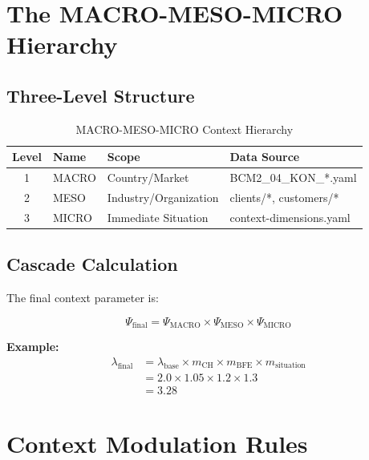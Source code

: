 \section{The MACRO-MESO-MICRO Hierarchy}
\label{sec:when-hierarchy}

\subsection{Three-Level Structure}

\begin{table}[htbp]
\centering
\caption{MACRO-MESO-MICRO Context Hierarchy}
\label{tab:when-hierarchy}
\renewcommand{\arraystretch}{1.3}
\begin{tabular}{@{}clll@{}}
\toprule
\textbf{Level} & \textbf{Name} & \textbf{Scope} & \textbf{Data Source} \\
\midrule
1 & MACRO & Country/Market & BCM2\_04\_KON\_*.yaml \\
2 & MESO & Industry/Organization & clients/*, customers/* \\
3 & MICRO & Immediate Situation & context-dimensions.yaml \\
\bottomrule
\end{tabular}
\end{table}

\subsection{Cascade Calculation}

The final context parameter is:

\begin{equation}
\Psi_{\text{final}} = \Psi_{\text{MACRO}} \times \Psi_{\text{MESO}} \times \Psi_{\text{MICRO}}
\end{equation}

\textbf{Example:}
\begin{align}
\lambda_{\text{final}} &= \lambda_{\text{base}} \times m_{\text{CH}} \times m_{\text{BFE}} \times m_{\text{situation}} \\
&= 2.0 \times 1.05 \times 1.2 \times 1.3 \\
&= 3.28
\end{align}


\section{Context Modulation Rules}
\label{sec:when-modulation}

